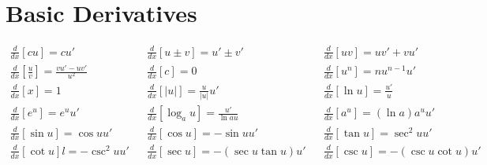 \section{Basic Derivatives}
\begin{align*}
  \frac{d}{dx}[cu]=cu' &&
  \frac{d}{dx}[u\pm v]=u' \pm v' &&
  \frac{d}{dx}[uv]=uv'+vu' \\
  \frac{d}{dx}\left[\frac{u}{v}\right]=\frac{vu'-uv'}{u^2} &&
  \frac{d}{dx}[c]=0 &&
  \frac{d}{dx}[u^n]=nu^{n-1}u' \\
  \frac{d}{dx}[x]=1 &&
  \frac{d}{dx}[|u|]=\frac{u}{|u|}u' &&
  \frac{d}{dx}[\ln{u}]=\frac{u'}{u} \\
  \frac{d}{dx}[e^u]=e^uu' &&
  \frac{d}{dx}[\log_{a}u]=\frac{u'}{\ln{a}u} &&
  \frac{d}{dx}[a^u]=(\ln{a})a^uu' \\
  \frac{d}{dx}[\sin{u}]=\cos{u}u' &&
  \frac{d}{dx}[\cos{u}]=-\sin{u}u' &&
  \frac{d}{dx}[\tan{u}]=\sec^2{u}u' \\
  \frac{d}{dx}[\cot{u}]l=-\csc^2{u}u' &&
  \frac{d}{dx}[\sec{u}]=-(\sec{u}\tan{u})u' &&
  \frac{d}{dx}[\csc{u}]=-(\csc{u}\cot{u})u' \\
\end{align*}
